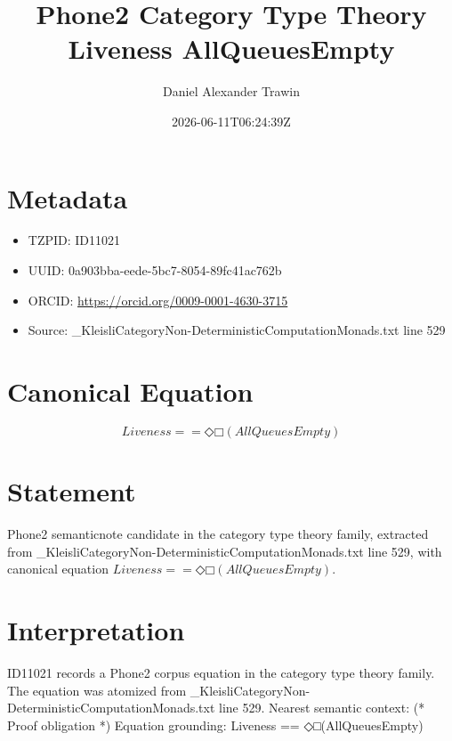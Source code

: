 \documentclass[11pt]{article}
\title{Phone2 Category Type Theory Liveness AllQueuesEmpty}
\author{Daniel Alexander Trawin}
\date{2026-06-11T06:24:39Z}
\begin{document}
\maketitle
\section*{Metadata}
\begin{itemize}
\item TZPID: ID11021
\item UUID: 0a903bba-eede-5bc7-8054-89fc41ac762b
\item ORCID: \url{https://orcid.org/0009-0001-4630-3715}
\item Source: _KleisliCategoryNon-DeterministicComputationMonads.txt line 529
\end{itemize}
\section*{Canonical Equation}
\[
Liveness == ◇□(AllQueuesEmpty)
\]
\section*{Statement}
Phone2 semanticnote candidate in the category type theory family, extracted from _KleisliCategoryNon-DeterministicComputationMonads.txt line 529, with canonical equation $Liveness == ◇□(AllQueuesEmpty)$.
\section*{Interpretation}
ID11021 records a Phone2 corpus equation in the category type theory family. The equation was atomized from _KleisliCategoryNon-DeterministicComputationMonads.txt line 529. Nearest semantic context: (* Proof obligation *) Equation grounding: Liveness == ◇□(AllQueuesEmpty)
\end{document}
